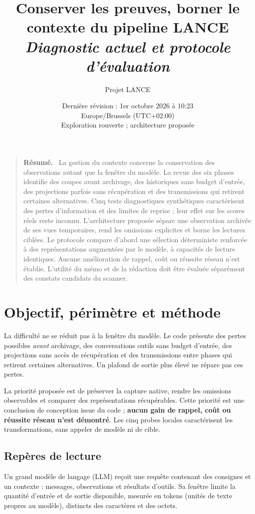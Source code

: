 \documentclass[11pt,a4paper]{article}
\title{\bfseries Conserver les preuves, borner le contexte du pipeline LANCE\\[0.5em]\large\mdseries\itshape Diagnostic actuel et protocole d'évaluation}
\author{Projet LANCE}
\date{Dernière révision : 1er octobre 2026 à 10:23\\[0.15em]\small Europe/Brussels (UTC+02:00)\\[0.4em]\small Exploration rouverte ; architecture proposée}
\renewenvironment{abstract}
  {\begin{quote}\small\noindent\textbf{Résumé.}\ }
  {\par\end{quote}}
\begin{document}
\maketitle
\begin{abstract}
La gestion du contexte concerne la conservation des observations autant que la fenêtre du modèle. La revue des six phases identifie des coupes avant archivage, des historiques sans budget d'entrée, des projections parfois sans récupération et des transmissions qui retirent certaines alternatives. Cinq tests diagnostiques synthétiques caractérisent des pertes d'information et des limites de reprise ; leur effet sur les scores réels reste inconnu. L'architecture proposée sépare une observation archivée de ses vues temporaires, rend les omissions explicites et borne les lectures ciblées. Le protocole compare d'abord une sélection déterministe renforcée à des représentations augmentées par le modèle, à capacités de lecture identiques. Aucune amélioration de rappel, coût ou réussite réseau n'est établie. L'utilité du mémo et de la rédaction doit être évaluée séparément des constats candidats du scanner.
\end{abstract}
\clearpage

\begingroup
\small
\tableofcontents
\endgroup
\clearpage

\section{Objectif, périmètre et méthode}
La difficulté ne se réduit pas à la fenêtre du modèle. Le code présente des pertes possibles \emph{avant} archivage, des conversations outils sans budget d'entrée, des projections sans accès de récupération et des transmissions entre phases qui retirent certaines alternatives. Un plafond de sortie plus élevé ne répare pas ces pertes.

La priorité proposée est de préserver la capture native, rendre les omissions observables et comparer des représentations récupérables. Cette priorité est une conclusion de conception issue du code ; \textbf{aucun gain de rappel, coût ou réussite réseau n'est démontré}. Les cinq probes locales caractérisent les transformations, sans appeler de modèle ni de cible.

\subsection{Repères de lecture}
Un grand modèle de langage (LLM) reçoit une requête contenant des consignes et
un contexte : messages, observations et résultats d'outils. Sa fenêtre limite
la quantité d'entrée et de sortie disponible, mesurée en tokens (unités de texte
propres au modèle), distincts des caractères et des octets.
\end{document}

